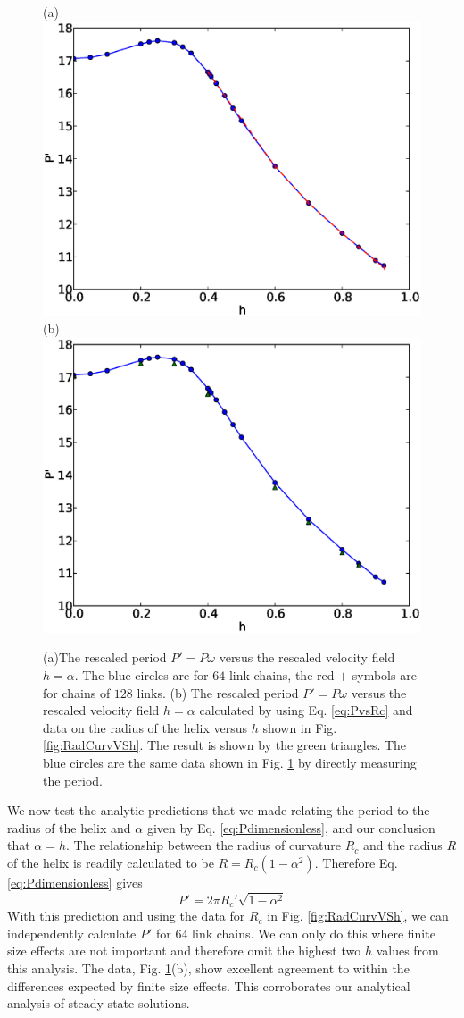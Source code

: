 \documentclass[11pt]{ucthesis}
\begin{document}
\begin{figure}[htp]
\begin{center}
(a) \includegraphics[width=0.45\hsize]{period_vs_h.eps}
(b) \includegraphics[width=0.45\hsize]{compare.eps}
\caption{ 
(a)The rescaled period $P' = P\omega$ versus the rescaled velocity field $h=\alpha$.
The blue circles are for $64$ link chains, the red $+$ symbols are for chains of $128$ links.
(b)
The rescaled period $P' = P\omega$ versus the rescaled velocity field $h=\alpha$
calculated by using Eq. \ref{eq:PvsRc} and data on the radius of the helix versus $h$ shown
in Fig. \ref{fig:RadCurvVSh}. The result is shown by the green triangles. 
The blue circles are the same data shown in Fig. \ref{fig:PeriodVSh} by directly
measuring the period. 
}
\label{fig:PeriodVSh}
\end{center}
\end{figure}




We now test the analytic predictions that we made relating the period to the radius of the helix and $\alpha$
given by Eq. \ref{eq:Pdimensionless}, and our conclusion that $\alpha = h$. The relationship between the
radius of curvature $R_c$ and the radius $R$ of the helix is readily calculated to be $R = R_c (1-\alpha^2)$.
Therefore Eq. \ref{eq:Pdimensionless} gives
\begin{equation}
\label{eq:PvsRc}
P' = 2 \pi R_c' \sqrt{1-\alpha^2}
\end{equation}
With this prediction and using the data for $R_c$ in Fig. \ref{fig:RadCurvVSh}, we can independently calculate $P'$ for $64$
link chains. We can only do this where finite size effects are not important and therefore omit the highest two $h$ values
from this analysis. The data, Fig. \ref{fig:PeriodVSh}(b), show excellent agreement to within the differences expected by finite size effects. This
corroborates our analytical analysis of steady state solutions. 
\end{document}
